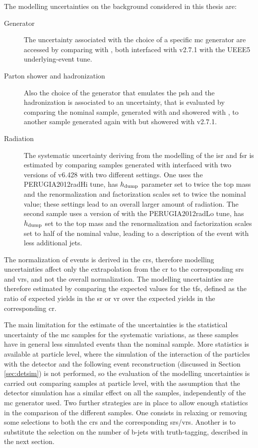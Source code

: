 The modelling uncertainties on the \ttbar background considered in this thesis are:
\begin{description}
\item[Generator] The uncertainty associated with the choice of a specific \gls{mc} generator are accessed by comparing \PowhegBox with \aNLO, both interfaced with \HWpp v2.7.1 with the UEEE5 underlying-event tune.

\item[Parton shower and hadronization] Also the choice of the generator that emulates the \gls{psh} and the hadronization is associated to an uncertainty, that is evaluated by comparing the nominal sample, generated with \PowhegBox and showered with \PY, to another sample generated again with \PowhegBox but showered with \HWpp v2.7.1. 

\item[Radiation] The systematic uncertainty deriving from the modelling of the \gls{isr} and \gls{fsr} is estimated by comparing samples
generated with \PowhegBox interfaced with two versions of \PY v6.428 with two different settings. One uses the PERUGIA2012radHi tune, has $h_{\rm{dump}}$ parameter set to twice the top mass and the renormalization and factorization scales set to twice the nominal value; these settings lead to an overall larger amount of radiation. The second sample uses a version of \PY with the PERUGIA2012radLo tune, has $h_{\rm{dump}}$ set to the top mass and the renormalization and factorization scales set to half of the nominal value, leading to a description of the event with less additional jets. 

\end{description}

The normalization of \ttbar events is derived in the \glspl{cr}, therefore modelling uncertainties affect only the extrapolation from 
the \gls{cr} to the corresponding \glspl{sr} and \glspl{vr}, and not the overall normalization. 
The modelling uncertainties are therefore estimated by comparing the expected values for the \glspl{tf}, defined as the ratio of expected yields in the \gls{sr} or \gls{vr} over the expected yields in the corresponding \gls{cr}. 

The main limitation for the estimate of the uncertainties is the statistical uncertainty of the \gls{mc} samples for the systematic variations, as these samples have in general less simulated events than the nominal sample. 
More statistics is available at particle level, where the simulation of the interaction of the particles with the detector and the following event reconstruction (discussed in Section \ref{sec:detsim}) is not performed, so the evaluation of the \ttbar modelling uncertainties is carried out 
comparing samples at particle level, with the assumption that the detector simulation has a similar effect on all the samples, 
independently of the \gls{mc} generator used. Two further strategies are in place to allow enough statistics in the comparison of the different samples. 
One consists in relaxing or removing some selections to both the \glspl{cr} and the corresponding \glspl{sr}/\glspl{vr}. 
Another is to substitute the selection on the number of b-jets with truth-tagging, described in the next section.

